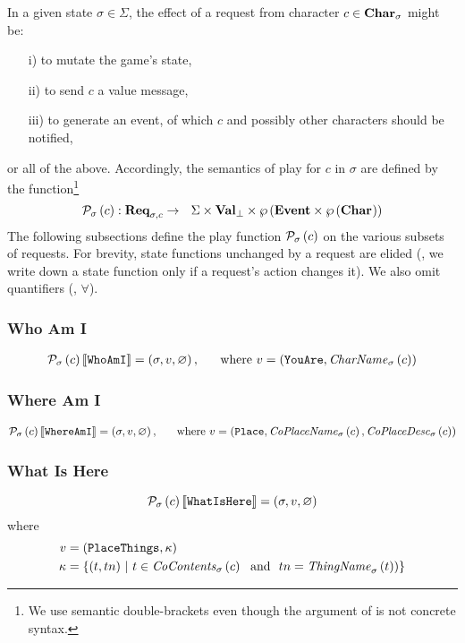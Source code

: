 In a given state $\sigma \in \Sigma$, the effect of a request from
character $c \in \textbf{Char}_{\sigma}$ might be:
\begin{itemize}
\item[i)] to mutate the game's state,
\item[ii)] to send $c$ a value message,
\item[iii)] to generate an event, of which $c$ and possibly other
characters should be notified,
\end{itemize}
or all of the above. Accordingly, the semantics of play for $c$ in
$\sigma$ are defined by the function\footnote{We use semantic
  double-brackets even though the argument of  is
  not concrete syntax.}
\[ \mathit{\mathcal{P}}_{\sigma}\left(c\right): \textbf{Req}_{\sigma,c} \rightarrow
~~\Sigma \times {\ensuremath{\textbf{Val}}}_{\bot} \times \wp\left(\textbf{Event}
  \times \wp\left(\textbf{Char}_{}\right)\right)
\]
The following subsections define the play function
$\mathit{\mathcal{P}}_{\sigma}\left(c\right)$ on the
various subsets of requests. For brevity, state functions unchanged by
a request are elided (\ie, we write down a state function only if a
request's action changes it). We also omit quantifiers (\eg, $\forall$).

\subsubsection{Who Am I}
\begin{align*}
  \mathit{\mathcal{P}}_{\sigma}\left(c\right)\llbracket \texttt{WhoAmI} \rrbracket = \left(\sigma, v, \varnothing\right), ~~~~~\text{where}~v =
  (\texttt{YouAre}, \mathit{CharName}_{\sigma}\left(c\right))
\end{align*}

\subsubsection{Where Am I}
\begin{align*}
  \mathit{\mathcal{P}}_{\sigma}\left(c\right)\llbracket \texttt{WhereAmI} \rrbracket = \left(\sigma, v, \varnothing\right), ~~~~~\text{where}~v =
  (\texttt{Place}, \mathit{CoPlaceName}_{\sigma}\left(c\right), \mathit{CoPlaceDesc}_{\sigma}\left(c\right))
\end{align*}

\subsubsection{What Is Here}
\[  \mathit{\mathcal{P}}_{\sigma}\left(c\right)\llbracket \texttt{WhatIsHere} \rrbracket =
\left(\sigma, v, \varnothing\right) \]
where
\begin{align*}
  v &= (\texttt{PlaceThings}, \kappa) \\
  \kappa & = \{ (t, tn) ~|~ t \in
  \mathit{CoContents}_{\sigma}\left(c\right) ~~\text{and}~~tn = \mathit{ThingName}_{\sigma}\left(t\right))\}
\end{align*}


